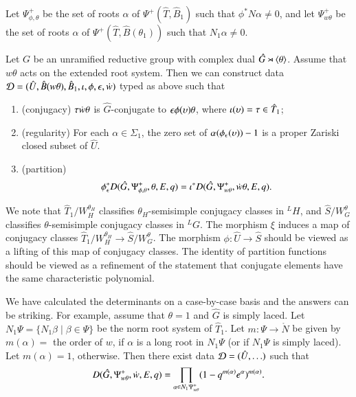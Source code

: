 Let $\Psi_{\phi,\theta}^+$ be the set of roots $\alpha$ of
  $\Psi^+(\hat T,\hat B_1)$ such that $\phi^*N\alpha\ne 0$, and let
  $\Psi_{w\theta}^+$ 
be the set of roots $\alpha$ of $\Psi^+(\hat T,\hat B(\theta_1))$ such
  that $N_1\alpha\ne0$.  

\begin{proposition}\label{lemma:ephi}
  Let $G$ be an unramified reductive group with complex dual $\hat
  G\rtimes \langle{\theta}\rangle$.  Assume that $w\theta$ acts on the extended
  root system.  Then we can construct data $\mathcal D=(\hat U,\hat B(w\theta),\hat
  B_1,\iota,\phi,\epsilon,\dot w)$ typed as above such that
\begin{enumerate}
\item (conjugacy) $\tau\dot w\theta$ is $\hat G$-conjugate to
  $\epsilon\phi(\upsilon) \theta$, where $\iota(\upsilon) = \tau\in\hat T_1$;
\item (regularity) For each $\alpha\in\Sigma_1$, the zero set of
  $\alpha(\phi_\epsilon(\upsilon))-1$ is a proper Zariski closed subset of $\hat U$.
\item (partition) 
\[
\phi^*_\epsilon D(\hat G,\Psi_{\phi,\theta}^+,\theta,E,q) =
\iota^* D(\hat G,\Psi_{w\theta}^+,\dot w\theta,E,q).
\]
\end{enumerate}
\end{proposition}

We note that $\hat T_1/W_H^{\theta_H}$ classifies
$\theta_H$-semisimple conjugacy classes in ${}^LH$, and
$\hat S/W_G^{\theta}$ classifies $\theta$-semisimple conjugacy classes
in ${}^LG$.  The morphism $\xi$ induces a map of conjugacy classes
$\hat T_1/W_H^{\theta_H}\to \hat S/W_G^\theta$.  The morphism
$\phi:\hat U\to\hat S$ should be viewed as a lifting of this map of
conjugacy classes.  The identity of partition functions should be
viewed as a refinement of the statement that conjugate elements have
the same characteristic polynomial.

\begin{remark}
  We have calculated the determinants on a case-by-case basis and the
  answers can be striking.  For example, assume that $\theta=1$ and
  $\hat G$ is simply laced.  Let
  $N_1\Psi=\{N_1\beta\mid \beta\in \Psi\}$ be the norm root system of
  $\hat T_1$.  Let $m:\Psi\to \ring{N}$ be given by $m(\alpha)=$ the
  order of $w$, if $\alpha$ is a long root in $N_1\Psi$ (or if
  $N_1\Psi$ is simply laced).  Let $m(\alpha) = 1$, otherwise.  Then
  there exist data $\mathcal D=(\hat U,\ldots)$ such that
\begin{equation}\label{eqn:laced0}
D(\hat G,\Psi_{w\theta}^+,\dot w,E,q) 
= \prod_{\alpha\in N_1\Psi_{w\theta}^{+}} (1- q^{m(\alpha)} e^\alpha)^{m(\alpha)}.
\end{equation}
\end{remark}

